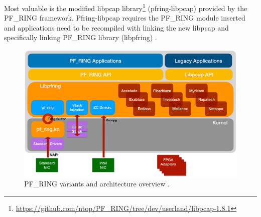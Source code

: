 \documentclass[12pt,a4paper,twoside]{report}
\begin{document}
			Most valuable is the modified libpcap library\footnote{\url{https://github.com/ntop/PF_RING/tree/dev/userland/libpcap-1.8.1}} (pfring-libpcap) provided by the PF\_RING framework. Pfring-libpcap requires the PF\_RING module inserted and applications need to be recompiled with linking the new libpcap and specifically linking PF\_RING library (libpfring) \cite{docs:pfring:libpcap}. 
			\begin{figure}[h]
				\centering
				\includegraphics[scale=0.35]{overall_pf_ring}
				\caption{PF\_RING variants and architecture overview \cite{image:ntop}.}
				\label{figure:pfring:overview}
			\end{figure}
\end{document}
